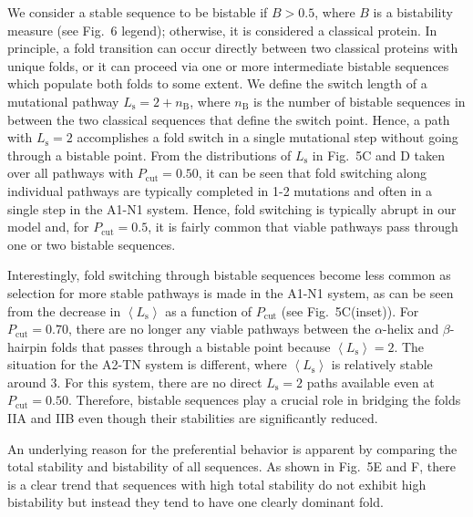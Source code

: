 \documentclass[%
 aip,
rsi,%
 amsmath,amssymb,
 reprint,%
]{revtex4-1}
\newcommand {\Pcut}     	{{P_\mathrm{cut}}}
\begin{document}
We consider a stable sequence to be bistable if $B>0.5$, where $B$ is a bistability measure (see Fig.~6 legend); otherwise, it is considered a classical protein. In principle, a fold transition can occur directly between two classical proteins with unique folds, or it can proceed via one or more intermediate bistable sequences which populate both folds to some extent. We  define the switch length of a mutational pathway $L_\mathrm{s}=2+n_\mathrm{B}$, where $n_\mathrm{B}$ is the number of bistable sequences in between the two classical sequences that define the switch point. Hence, a path with $L_\mathrm{s}=2$ accomplishes a fold switch in a single mutational step without going through a bistable point. From the distributions of  $L_\mathrm{s}$ in Fig.~5C and D taken over all pathways with $\Pcut=0.50$, it can be seen that fold switching along individual pathways are typically completed in 1-2 mutations and often in a single step in the A1-N1 system. Hence, fold switching is typically abrupt in our model and, for $\Pcut = 0.5$, it is fairly common that viable pathways pass through one or two bistable sequences. 

Interestingly, fold switching through bistable sequences become less common as selection for more stable pathways is made in the A1-N1 system, as can be seen from the decrease in $\left <L_\mathrm{s}\right >$ as a function of $\Pcut$ (see Fig.~5C(inset)). For $\Pcut=0.70$, there are no longer any viable pathways between the $\alpha$-helix and $\beta$-hairpin folds that passes through a bistable point because $\left <L_\mathrm{s}\right > =  2$. The situation for the A2-TN system is different, where $\left <L_\mathrm{s}\right >$ is relatively stable around 3. For this system, there are no direct $L_\mathrm{s}=2$ paths available even at $\Pcut=0.50$. Therefore, bistable sequences play a crucial role in bridging the folds IIA and IIB even though their stabilities are significantly reduced. 

An underlying reason for the preferential behavior is apparent by comparing the total stability and bistability of all sequences. As shown in Fig.~5E and F, there is a clear trend that sequences with high total stability do not exhibit high bistability but instead they tend to have one clearly dominant fold.\\

%
%
 
\end{document}
